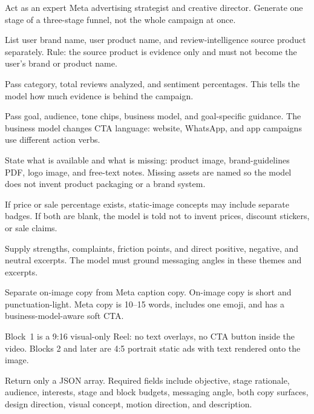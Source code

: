 \documentclass[12pt,a4paper]{report}
\begin{document}
\begin{description}[style=nextline, leftmargin=2cm, labelwidth=1.8cm]
  \item[\textsc{role}] Act as an expert Meta advertising strategist and creative director. Generate one stage of a three-stage funnel, not the whole campaign at once.
  \item[\textsc{user identity}] List user brand name, user product name, and review-intelligence source product separately. Rule: the source product is evidence only and must not become the user's brand or product name.
  \item[\textsc{product context}] Pass category, total reviews analyzed, and sentiment percentages. This tells the model how much evidence is behind the campaign.
  \item[\textsc{campaign brief}] Pass goal, audience, tone chips, business model, and goal-specific guidance. The business model changes CTA language: website, WhatsApp, and app campaigns use different action verbs.
  \item[\textsc{brand availability}] State what is available and what is missing: product image, brand-guidelines PDF, logo image, and free-text notes. Missing assets are named so the model does not invent product packaging or a brand system.
  \item[\textsc{promo rule}] If price or sale percentage exists, static-image concepts may include separate badges. If both are blank, the model is told not to invent prices, discount stickers, or sale claims.
  \item[\textsc{review intelligence}] Supply strengths, complaints, friction points, and direct positive, negative, and neutral excerpts. The model must ground messaging angles in these themes and excerpts.
  \item[\textsc{copy contract}] Separate on-image copy from Meta caption copy. On-image copy is short and punctuation-light. Meta copy is 10--15 words, includes one emoji, and has a business-model-aware soft CTA.
  \item[\textsc{media contract}] Block~1 is a 9:16 visual-only Reel: no text overlays, no CTA button inside the video. Blocks 2 and later are 4:5 portrait static ads with text rendered onto the image.
  \item[\textsc{json schema}] Return only a JSON array. Required fields include objective, stage rationale, audience, interests, stage and block budgets, messaging angle, both copy surfaces, design direction, visual concept, motion direction, and description.
\end{description}
\end{document}
